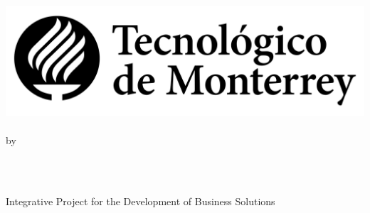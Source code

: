 \documentclass[11pt, a4paper, oneside]{assets/tex/thesis} %
\title{\ttitle}
\begin{document}
\frontmatter
{}

\fancyhead{}
\rhead{\thepage}
\lhead{}

\pagestyle{fancy}
\newcommand{\HRule}{\rule{\linewidth}{0.5mm}}

\hypersetup{pdfsubject=\subjectname}
\hypersetup{pdfkeywords=\keywordnames}



\begin{titlepage}
\begin{center}

\textsc{\Large \univname}\\
\textsc{\Large \facname}\\
\textsc{\Large \schoolname}\\[1cm]
\includegraphics[scale=.3]{assets/img/logo_tec.png} \\
\\[0.5cm]

\large by\\[0.5cm]

\begin{minipage}{0.4\textwidth}
\begin{center} \large
{}
\large{\href{mailto:bvaldesa@itesm.mx?subject=Awesome thesis, man!}{\authornames}} 
\\[0.5cm] 
\end{center}
\end{minipage}\\[0.5cm]

\large Integrative Project for the Development of Business Solutions \\ \textit{\degreename}\\[0.8cm]


\end{center}
\end{titlepage}
\end{document}
